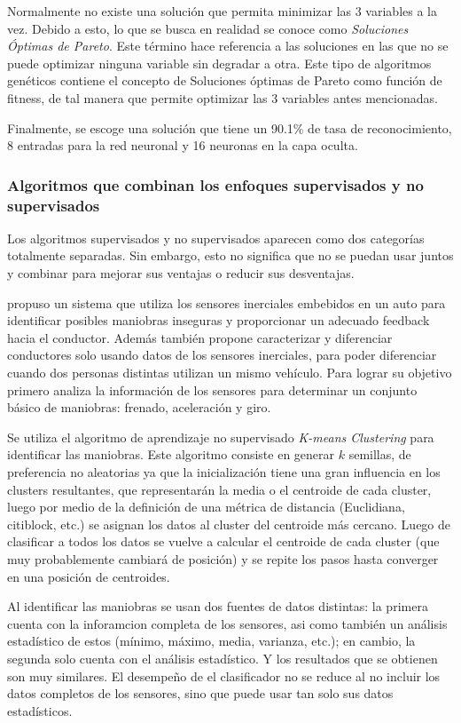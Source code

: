 Normalmente no existe una solución que permita minimizar las 3 variables a la vez. Debido a esto, lo que se busca en realidad se conoce como {\it Soluciones Óptimas de Pareto}. Este término hace referencia a las soluciones en las que no se puede optimizar ninguna variable sin degradar a otra. Este tipo de algoritmos genéticos contiene el concepto de Soluciones óptimas de Pareto como función de fitness, de tal manera que permite optimizar las 3 variables antes mencionadas.

Finalmente, se escoge una solución que tiene un 90.1\% de tasa de reconocimiento, 8 entradas para la red neuronal y 16 neuronas en la capa oculta.

\subsubsection{Algoritmos que combinan los enfoques supervisados y no supervisados}

Los algoritmos supervisados y no supervisados aparecen como dos categorías totalmente separadas. Sin embargo, esto no significa que no se puedan usar juntos y combinar para mejorar sus ventajas o reducir sus desventajas.

\citeauthor{6629603} \cite{6629603} propuso un sistema
que utiliza los sensores inerciales embebidos en un auto para identificar posibles maniobras inseguras y proporcionar un adecuado feedback hacia el conductor. Además también propone caracterizar y diferenciar conductores solo usando datos de los sensores inerciales, para poder diferenciar cuando dos personas distintas utilizan un mismo vehículo. Para lograr su objetivo primero analiza la información de los sensores para determinar un conjunto básico de maniobras: frenado, aceleración y giro.


Se utiliza el algoritmo de aprendizaje no supervisado {\it K-means Clustering} para identificar las maniobras. Este algoritmo consiste en generar $k$ semillas, de preferencia no aleatorias ya que la inicialización tiene una gran influencia en los clusters resultantes, que representarán la media o el centroide de cada cluster, luego por medio de la definición de una métrica de distancia (Euclidiana, citiblock, etc.) se asignan los datos al cluster del centroide más cercano. Luego de clasificar a todos los datos se vuelve a calcular el centroide de cada cluster (que muy probablemente cambiará de posición) y se repite los pasos hasta converger en una posición de centroides.


Al identificar las maniobras se usan dos fuentes de datos distintas: la primera cuenta con la inforamcion completa de los sensores, asi como también un análisis estadístico de estos (mínimo, máximo, media, varianza, etc.); en cambio, la segunda solo cuenta con el análisis estadístico. Y los resultados que se obtienen son muy similares. El desempeño de el clasificador no se reduce al no incluir los datos completos de los sensores, sino que puede usar tan solo sus datos estadísticos.

